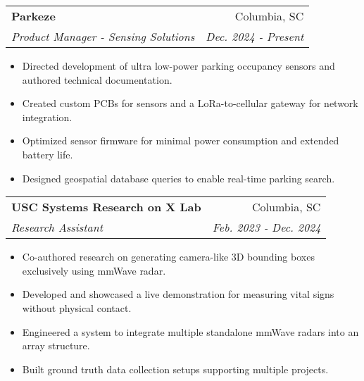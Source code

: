 \documentclass[letterpaper,12pt]{article}
\makeatletter
\newcommand{\resumeItem}[2]{
  \item\small{
    \textbf{#1}{: #2 \vspace{-2pt}}
  }
}
\newcommand{\resumeItemLine}[1]{
  \item\small{
    {#1 \vspace{-3pt}}
  }
}
\newcommand{\resumeSubheading}[4]{
  \vspace{-3pt}\item
    \begin{tabular*}{0.97\textwidth}{l@{\extracolsep{\fill}}r}
      \textbf{#1} & #2 \\
      \textit{\small#3} & \textit{\small #4} \\
    \end{tabular*}\vspace{-7pt}
}
\newcommand{\resumeItemListStart}{\begin{itemize}}
\newcommand{\resumeItemListEnd}{\end{itemize}\vspace{-5pt}}
\makeatother
\begin{document}
    \resumeSubheading
      {Parkeze}{Columbia, SC}
      {Product Manager - Sensing Solutions}{Dec. 2024 - Present}
      \resumeItemListStart
        \resumeItemLine{Directed development of ultra low-power parking occupancy sensors and authored technical documentation.}
        \resumeItemLine{Created custom PCBs for sensors and a LoRa-to-cellular gateway for network integration.}
        \resumeItemLine{Optimized sensor firmware for minimal power consumption and extended battery life.}
        \resumeItemLine{Designed geospatial database queries to enable real-time parking search.}
      \resumeItemListEnd
      
    \resumeSubheading
      {USC Systems Research on X Lab}{Columbia, SC}
      {Research Assistant}{Feb. 2023 - Dec. 2024}
      \resumeItemListStart
        \resumeItemLine{Co-authored research on generating camera-like 3D bounding boxes exclusively using mmWave radar.}
        \resumeItemLine{Developed and showcased a live demonstration for measuring vital signs without physical contact.}
        \resumeItemLine{Engineered a system to integrate multiple standalone mmWave radars into an array structure.}
        \resumeItemLine{Built ground truth data collection setups supporting multiple projects.}
      \resumeItemListEnd

\end{document}
